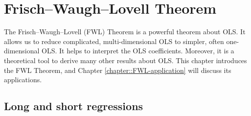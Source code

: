  
\chapter{Frisch--Waugh--Lovell Theorem}
 \label{chapter::FWL-theorem}
 
 
The Frisch--Waugh--Lovell (FWL) Theorem is a powerful theorem about OLS. It allows us to reduce complicated, multi-dimensional OLS to simpler, often one-dimensional OLS. It helps to interpret the OLS coefficients. Moreover, it is a theoretical tool to derive many other results about OLS.
This chapter introduces the FWL Theorem, and Chapter \ref{chapter::FWL-application} will discuss its applications. 
   
 
 

\section{Long and short regressions}

